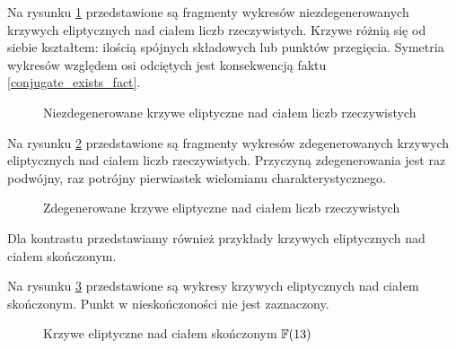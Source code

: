 \begin{example}
Na rysunku \ref{real_nondeg_curves_fig} przedstawione są fragmenty wykresów
niezdegenerowanych krzywych eliptycznych nad ciałem liczb rzeczywistych.
Krzywe różnią się od siebie kształtem:
ilością spójnych składowych lub punktów przegięcia.
Symetria wykresów względem osi odciętych
jest konsekwencją faktu \ref{conjugate_exists_fact}.

\begin{figure}[h]
\centering
{}
\hspace{1cm}
\hspace{1cm}
\caption{Niezdegenerowane krzywe eliptyczne nad ciałem liczb rzeczywistych}
\label{real_nondeg_curves_fig}
\end{figure}
\end{example}

\begin{example}
Na rysunku \ref{real_degen_curves_fig} przedstawione są fragmenty wykresów
zdegenerowanych krzywych eliptycznych nad ciałem liczb rzeczywistych.
Przyczyną zdegenerowania jest raz podwójny, raz potrójny
pierwiastek wielomianu charakterystycznego.

\begin{figure}[h]
\centering
{}
\hspace{1cm}
\caption{Zdegenerowane krzywe eliptyczne nad ciałem liczb rzeczywistych}
\label{real_degen_curves_fig}
\end{figure}
\end{example}

\noindent
Dla kontrastu przedstawiamy również
przykłady krzywych eliptycznych nad ciałem skończonym.

\begin{example}
Na rysunku \ref{finite_curves_fig} przedstawione są wykresy
krzywych eliptycznych nad ciałem skończonym.
Punkt w nieskończoności nie jest zaznaczony.

\begin{figure}[h]
\centering
{}
\hspace{0.5cm}
\caption{Krzywe eliptyczne nad ciałem skończonym $\mathbb{F}(13)$}
\label{finite_curves_fig}
\end{figure}
\end{example}
